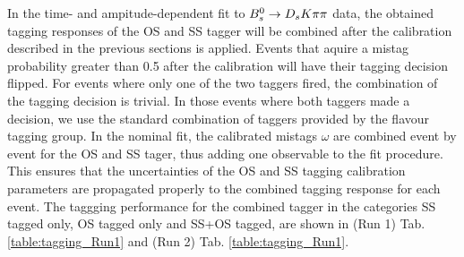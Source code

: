 In the time- and ampitude-dependent fit to ${{B}^0_{s}}\rightarrow{\ensuremath{{D}_{s}}}{\ensuremath{K}}{\ensuremath{\pi}}{\ensuremath{\pi}}$ data, the obtained tagging responses of the OS and SS tagger will be combined after the calibration described in the previous sections is applied.
Events that aquire a mistag probability greater than 0.5 after the calibration will have their tagging decision flipped. For events where only one of the two taggers fired, the combination of the tagging decision is trivial.
In those events where both taggers made a decision, we use the standard combination of taggers \cite{LHCb-PAPER-2011-027} provided by the flavour tagging group. 
In the nominal fit, the calibrated mistags $\omega$ are combined event by event for the OS and SS tager, thus adding one observable to the fit procedure. 
This ensures that the uncertainties of the OS and SS tagging calibration parameters are propagated properly to the combined tagging response for each event. \newline
The taggging performance for the combined tagger in the categories SS tagged only, 
OS tagged only and SS+OS tagged, are shown in (Run 1) Tab. \ref{table:tagging_Run1} and (Run 2) Tab. \ref{table:tagging_Run1}.









